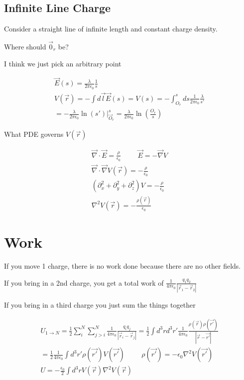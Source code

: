 \documentclass[fleqn]{report}
\newcommand{\hp}{\hspace{1cm}}
\newcommand{\del}{\partial}
\newcommand{\equations} [1] {
\begin{gather*}
#1
\end{gather*}
}
\begin{document}
\subsection{Infinite Line Charge}
Consider a straight line of infinite length and constant charge density. 

Where should $\vec 0_{r}$ be?

I think we just pick an arbitrary point 

\equations{
    \vec E(s) = \frac{\lambda}{2 \pi \epsilon_0} \frac{1}{s}
    \\
    V(\vec r) = - \int d \vec l \vec E(s) = V(s) = 
    - \int^s_{O_r} ds \frac{1}{2 \pi \epsilon_0} \frac{\lambda}{s'}
    \\
    =
    - \frac{\lambda}{2 \pi \epsilon_0} \ln(s') \Big|^s_{\vec O_r}
    =
    \frac{\lambda}{2 \pi \epsilon_0} \ln(\frac{O_r}{s})
}

What PDE governs $V(\vec r)$

\equations{
    \vec \nabla \cdot \vec E = \frac{\rho}{\epsilon_0}
    \hp 
    \vec E = - \vec \nabla V 
    \\
    \vec \nabla \cdot \vec \nabla V(\vec r) = -\frac{\rho}{\epsilon_0}
    \\
    (\del_x^2 + \del_y^2 + \del_z^2) V = -\frac{\rho}{\epsilon_0}
    \\
    \nabla^2 V(\vec r) = -\frac{\rho(\vec r)}{\epsilon_0}
}


\section{Work}
If you move 1 charge, there is no work done because there are no other 
fields. 

If you bring in a 2nd charge, you get a total work of 
$
\frac{1}{4 \pi \epsilon_0} \frac{q_1 q_2}{|\vec r_1 - \vec r_2|}
$

If you bring in a third charge you just sum the things together 

\equations{
    U_{1 \to N} = \frac{1}{2} \sum^N_i \sum^N_{j > i} 
    \frac{1}{4 \pi \epsilon_0} \frac{q_i q_j}{|\vec r_i - \vec r_j|}
    =
    \frac{1}{2} \int d^3 r d^3 r' \frac{1}{4 \pi \epsilon_0} 
    \frac{\rho(\vec r) \rho(\vec{r'})}{|\vec r - \vec{r'}|}
    \\
    =
    \frac{1}{2} \frac{1}{4 \pi \epsilon_0} 
    \int d^3 r' \rho(\vec{r'}) V(\vec{r'})
    \hp 
    \rho(\vec{r'}) = - \epsilon_0 \nabla^2 V(\vec{r'})
    \\
    U = - \frac{\epsilon_0}{2} \int d^3 r V(\vec r) \nabla^2 V(\vec r)
}
\end{document}

